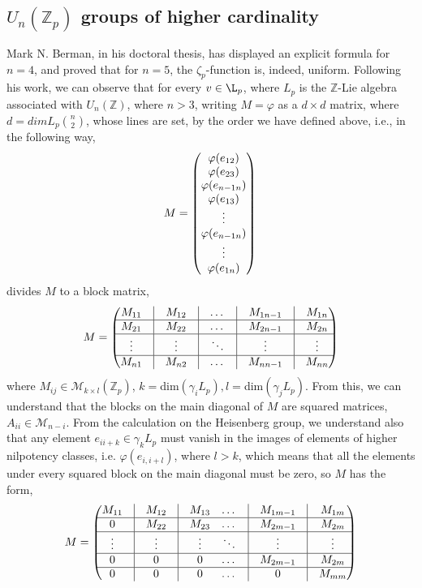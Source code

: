 \documentclass[12pt]{article}
\begin{document}
\subsection{$U_n(\mathbb{Z}_p)$ groups of higher cardinality}
Mark N. Berman, in his doctoral thesis\cite{Berman}, has displayed an explicit formula for $n=4$, and proved that for $n=5$, the $\zeta_p$-function is, indeed, uniform.
Following his work, we can observe that for every $v\in\L_p$, where $L_p$ is the $\mathbb{Z}$-Lie algebra associated with $U_n(\mathbb{Z})$, where $n>3$, writing $M=\varphi$ as a $d\times d$ matrix, where $d=dimL_p\binom{n}{2}$, whose lines are set, by the order we have defined above, i.e., in the following way,
$$
M=\begin{pmatrix}
\varphi(e_{12})\\
\varphi(e_{23})\\
\varphi(e_{n-1n})\\
\varphi(e_{13})\\
\vdots\\
\varphi(e_{n-1n})\\
\vdots\\
\varphi(e_{1n})\\
\end{pmatrix}\\
$$
divides $M$ to a block matrix, $$M=\begin{pmatrix}
M_{11} & \vline & M_{12}&\vline & \dots& \vline & M_{1n-1} & \vline&M_{1n}\\
\hline
M_{21} & \vline & M_{22}&\vline & \dots &\vline & M_{2n-1} &\vline& M_{2n}\\
\hline
\vdots & \vline & \vdots&\vline & \ddots &\vline & \vdots &\vline& \vdots\\
\hline
M_{n1} & \vline & M_{n2}&\vline & \dots &\vline & M_{nn-1} &\vline& M_{nn}\\
\end{pmatrix}
$$
where $M_{ij}\in\mathcal{M}_{k\times l}(\mathbb{Z}_p)$, $k=$dim$(\gamma_iL_p),l=$dim$(\gamma_jL_p)$. From this, we can understand that the blocks on the main diagonal of $M$ are squared matrices, $A_{ii}\in\mathcal{M}_{n-i}$. From the calculation on the Heisenberg group, we understand also that any element $e_{ii+k}\in\gamma_kL_p$ must vanish in the images of elements of higher nilpotency classes, i.e. $\varphi(e_{i,i+l})$, where $l>k$, which means that all the elements under every squared block on the main diagonal must be zero, so $M$ has the form, $$M=\begin{pmatrix}
M_{11} & \vline & M_{12}&\vline & M_{13} & \dots& \vline & M_{1m-1} & \vline&M_{1m}\\
\hline
0 & \vline & M_{22}&\vline & M_{23} & \dots &\vline & M_{2m-1} &\vline& M_{2m}\\
\hline
\vdots & \vline & \vdots&\vline & \vdots & \ddots &\vline & \vdots &\vline& \vdots\\
\hline
0 & \vline & 0&\vline & 0 & \dots &\vline & M_{2m-1} &\vline& M_{2m}\\
\hline
0 & \vline & 0 &\vline & 0 & \dots &\vline & 0 &\vline& M_{mm}\\
\end{pmatrix}
$$
\end{document}
